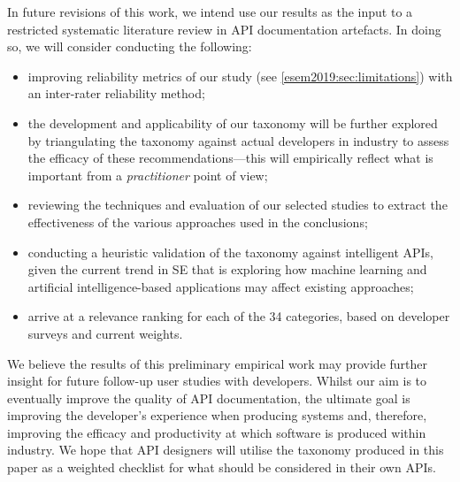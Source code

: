 In future revisions of this work, we intend use our results as the input to a restricted systematic literature review in API documentation artefacts. In doing so, we will consider conducting the following:

\begin{itemize}
  \item improving reliability metrics of our study (see \cref{esem2019:sec:limitations}) with an inter-rater reliability method;
  \item the development and applicability of our taxonomy will be further explored by triangulating the taxonomy  against actual developers in industry to assess the efficacy of these recommendations---this will empirically reflect what is important from a \textit{practitioner} point of view;
  \item reviewing the techniques and evaluation of our selected studies to extract the effectiveness of the various approaches used in the conclusions;
  \item conducting a heuristic validation of the taxonomy against intelligent APIs, given the current trend in SE that is exploring how machine learning and artificial intelligence-based applications may affect existing approaches;
  \item  arrive at a relevance ranking for each of the 34 categories, based on developer surveys and current weights.
\end{itemize}


We believe the results of this preliminary empirical work may provide further insight for future follow-up user studies with developers. Whilst our aim is to eventually improve the quality of API documentation, the ultimate goal is  improving the developer's experience when producing systems and, therefore, improving the efficacy and productivity at which software is produced within industry.   We hope that API designers will utilise the taxonomy produced in this paper as a weighted checklist for what should be considered in their own APIs.

\def\cn{}
\def\cy{\checkmark}

